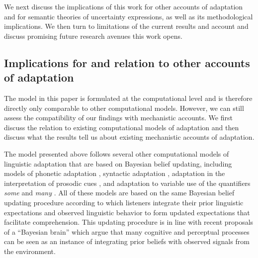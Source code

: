 \documentclass[man, floatsintext]{apa6}
\begin{document}
We next discuss the implications of this work for other accounts of adaptation and for semantic theories of uncertainty expressions, as well as its methodological implications. We then turn to limitations of the current results and account and discuss promising future research avenues this work opens. 



\subsection{Implications for and relation to other accounts of adaptation}

The model in this paper is formulated at the computational level \parencite{Marr1982,Anderson1990} 
and is therefore directly only comparable to other computational models. However, we can still assess 
the compatibility of our findings with mechanistic accounts. We first discuss the relation to existing computational 
models of adaptation and then discuss what the results tell us about existing mechanistic accounts of
 adaptation.

The model presented above follows several other computational models of linguistic adaptation that are based 
on Bayesian belief updating, including models of phonetic adaptation \parencite{Kleinschmidt2015}, syntactic 
adaptation \parencite{Kleinschmidt2012}, adaptation in the interpretation of prosodic cues \parencite{Roettger2019},
and adaptation to variable use of the quantifiers \textit{some} and \textit{many} \parencite{Qing2014}. 
All of these models are based on the same Bayesian belief updating procedure according to which listeners integrate
their prior linguistic expectations and observed linguistic behavior to form updated expectations that facilitate comprehension.
This updating procedure is in line with recent proposals of a ``Bayesian brain'' \parencite[e.g.,][]{Clark2013,Friston2010} which argue that
many cognitive and perceptual processes can be seen as an instance of integrating prior beliefs with observed signals from the environment.

\end{document}
